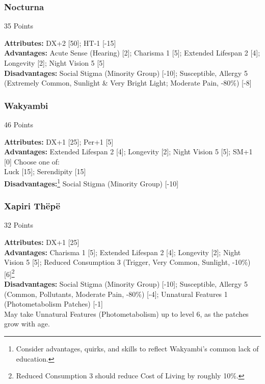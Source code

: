 \begin{multicols*}{3}
	\subsubsection*{Nocturna}
	\begin{flushright}
		35 Points
	\end{flushright}
	\textbf{Attributes:} 
	DX+2 [50]; HT-1 [-15]
	\\\textbf{Advantages:} 
	Acute Sense (Hearing) [2]; Charisma 1 [5]; Extended Lifespan 2 [4]; Longevity [2]; Night Vision 5 [5]
	\\\textbf{Disadvantages:} 
	Social Stigma (Minority Group) [-10]; Susceptible, Allergy 5 (Extremely Common, Sunlight \& Very Bright Light; Moderate Pain, -80\%) [-8]
	
	\subsubsection*{Wakyambi}
	\begin{flushright}
		46 Points
	\end{flushright}
	\textbf{Attributes:} 
	DX+1 [25]; Per+1 [5]
	\\\textbf{Advantages:} 
	Extended Lifespan 2 [4]; Longevity [2]; Night Vision 5 [5]; SM+1 [0]
	Choose one of: \\
	Luck [15]; Serendipity [15]
	\\\textbf{Disadvantages:}\footnote{Consider advantages, quirks, and skills to reflect Wakyambi's common lack of education.}
	Social Stigma (Minority Group) [-10]
	
	\subsubsection*{Xapiri Thëpë}
	\begin{flushright}
		32 Points
	\end{flushright}
	\textbf{Attributes:} 
	DX+1 [25]
	\\\textbf{Advantages:} 
	Charisma 1 [5]; Extended Lifespan 2 [4]; Longevity [2]; Night Vision 5 [5]; Reduced Consumption 3 (Trigger, Very Common, Sunlight, -10\%)[6]\footnote{Reduced Consumption 3 should reduce Cost of Living by roughly 10\%.}
	\\\textbf{Disadvantages:} 
	Social Stigma (Minority Group) [-10]; Susceptible, Allergy 5 (Common, Pollutants, Moderate Pain, -80\%) [-4]; Unnatural Features 1 (Photometabolism Patches) [-1]
	\\ May take Unnatural Features (Photometabolism) up to level 6, as the patches grow with age.
	

\end{multicols*}
